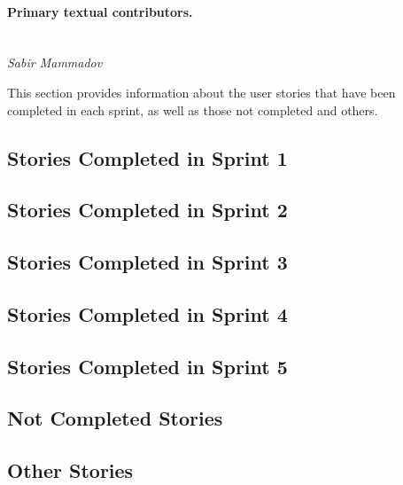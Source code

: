 \paragraph{Primary textual contributors.}
\mbox{}\\\emph{Sabir Mammadov}

This section provides information about the user stories that have been completed in each sprint, as well as those not completed and others.

\subsection{Stories Completed in Sprint 1}


\subsection{Stories Completed in Sprint 2}


\subsection{Stories Completed in Sprint 3}


\subsection{Stories Completed in Sprint 4}


\subsection{Stories Completed in Sprint 5}


\subsection{Not Completed Stories}


\subsection{Other Stories}
